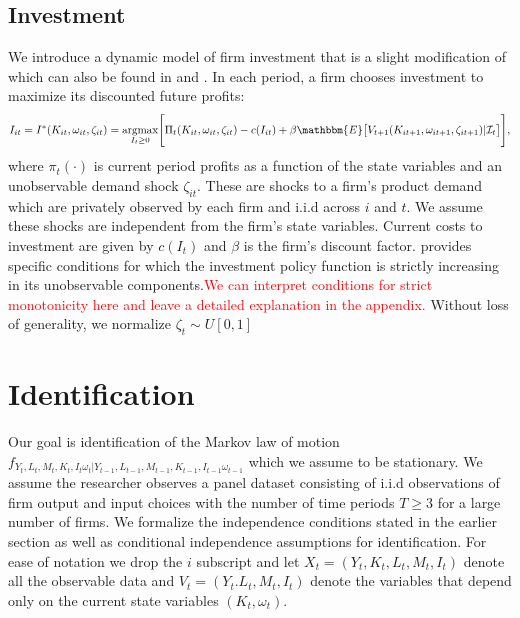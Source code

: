 \documentclass{article}
\begin{document}
\subsection{Investment} \label{investment}
We introduce a dynamic model of firm investment that is a slight modification of \cite{Ericson1995} which can also be found in \cite{Hu2013} and \cite{Ackerberg2007}. In each period, a firm chooses investment to maximize its discounted future profits:
\begin{equation} \label{valuefn}
I_{it}=I^{*}(K_{it}, \omega_{it}, \zeta_{it})=\underset{I_{t}\geq 0}{\operatorname{argmax}}\Bigg[\Pi_{t}(K_{it}, \omega_{it}, \zeta_{it})-c(I_{it})+\beta\mathbbm{E}\big[V_{t+1}(K_{it+1}, \omega_{it+1}, \zeta_{it+1})|\mathcal{I}_{t}\big]\Bigg],
\end{equation}
where $\pi_{t}(\cdot)$ is current period profits as a function of the state variables and an unobservable demand shock $\zeta_{it}$. These are shocks to a firm's product demand which are privately observed by each firm and i.i.d across $i$ and $t$. We assume these shocks are independent from the firm's state variables. Current costs to investment are given by $c(I_{t})$ and $\beta$ is the firm's discount factor. \cite{Pakesa} provides specific conditions for which the investment policy function is strictly increasing in its unobservable components.\textcolor{red}{We can interpret conditions for strict monotonicity here and leave a detailed explanation in the appendix.} Without loss of generality, we normalize $\zeta_{t}\sim U[0,1]$
\section{Identification}

Our goal is identification of the Markov law of motion $f_{Y_{t}, L_{t}, M_{t}, K_{t}, I_{t} \omega_{t}|Y_{t-1}, L_{t-1}, M_{t-1}, K_{t-1}, I_{t-1} \omega_{t-1}}$ which we assume to be stationary. We assume the researcher observes a panel dataset consisting of i.i.d observations of firm output and input choices with the number of time periods $T\geq 3$ for a large number of firms. We formalize the independence conditions stated in the earlier section as well as conditional independence assumptions for identification. For ease of notation we drop the $i$ subscript and let $X_{t}=(Y_{t}, K_{t}, L_{t}, M_{t}, I_{t})$ denote all the observable data and $V_{t}=(Y_{t}. L_{t}, M_{t}, I_{t})$ denote the variables that depend only on the current state variables $(K_{t}, \omega_{t})$.
\end{document}
